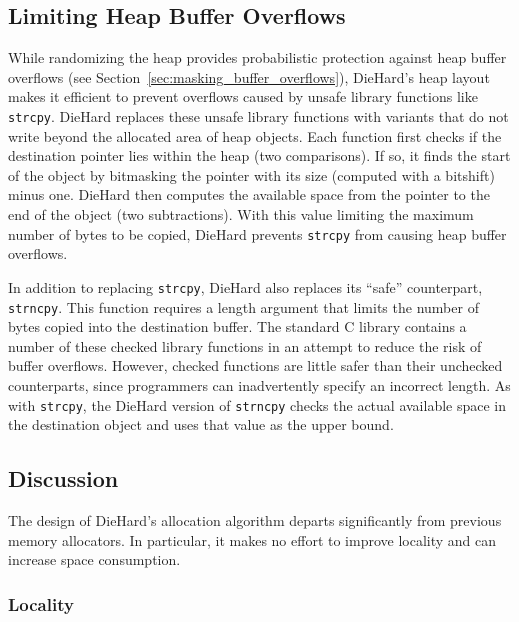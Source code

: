 \documentclass{sig-alternate}
\begin{document}
\subsection{Limiting Heap Buffer Overflows}

\label{sec:limiting_heap_buffer_overflows}

\noindent
While randomizing the heap provides probabilistic protection against
heap buffer overflows (see
Section~\ref{sec:masking_buffer_overflows}), DieHard's heap layout
makes it efficient to prevent overflows caused by unsafe library
functions like \texttt{strcpy}. DieHard replaces these unsafe library
functions with variants that do not write beyond the allocated area of
heap objects. Each function first checks if the destination pointer
lies within the heap (two comparisons). If so, it finds the start of
the object by bitmasking the pointer with its size (computed with a
bitshift) minus one. DieHard then computes the available space from
the pointer to the end of the object (two subtractions). With this
value limiting the maximum number of bytes to be copied, DieHard
prevents \texttt{strcpy} from causing heap buffer overflows.

In addition to replacing \texttt{strcpy}, DieHard also replaces its
``safe'' counterpart, \texttt{strncpy}. This function requires a
length argument that limits the number of bytes copied into the
destination buffer. The standard C library contains a number of these
checked library functions in an attempt to reduce the risk of buffer
overflows. However, checked functions are little safer than their
unchecked counterparts, since programmers can inadvertently specify an
incorrect length. As with
\texttt{strcpy}, the DieHard version of \texttt{strncpy} checks the
actual available space in the destination object and uses that value
as the upper bound.


\subsection{Discussion}

\noindent
The design of DieHard's allocation algorithm departs significantly
from previous memory allocators. In particular, it makes no effort to
improve locality and can increase space consumption.

\subsubsection*{Locality}
\end{document}
